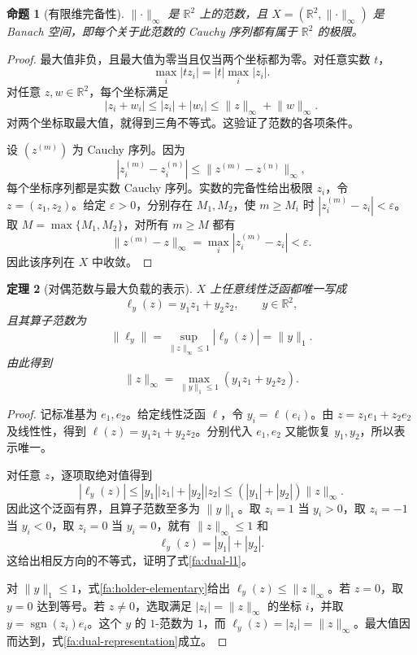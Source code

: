 \documentclass[UTF8,a4paper]{ctexbook}
\newtheorem{theorem}{定理}[chapter]
\newtheorem{proposition}[theorem]{命题}
\theoremstyle{definition}
\numberwithin{equation}{chapter}
\newcommand{\1}{\mathbf{1}}
\begin{document}
\begin{proposition}[有限维完备性]\label{fa:banach}
$\lVert\cdot\rVert_\infty$ 是 $\mathbb R^2$ 上的范数，且 $X=(\mathbb R^2,\lVert\cdot\rVert_\infty)$ 是 Banach 空间，即每个关于此范数的 Cauchy 序列都有属于 $\mathbb R^2$ 的极限。
\end{proposition}

\begin{proof}
最大值非负，且最大值为零当且仅当两个坐标都为零。对任意实数 $t$，
\[
\max_i|tz_i|=|t|\max_i|z_i|.
\]
对任意 $z,w\in\mathbb R^2$，每个坐标满足
\[
|z_i+w_i|\le |z_i|+|w_i|
\le\lVert z\rVert_\infty+\lVert w\rVert_\infty.
\]
对两个坐标取最大值，就得到三角不等式。这验证了范数的各项条件。

设 $(z^{(m)})$ 为 Cauchy 序列。因为
\[
|z_i^{(m)}-z_i^{(n)}|\le\lVert z^{(m)}-z^{(n)}\rVert_\infty,
\]
每个坐标序列都是实数 Cauchy 序列。实数的完备性给出极限 $z_i$，令 $z=(z_1,z_2)$。给定 $\varepsilon>0$，分别存在 $M_1,M_2$，使 $m\ge M_i$ 时 $|z_i^{(m)}-z_i|<\varepsilon$。取 $M=\max\{M_1,M_2\}$，对所有 $m\ge M$ 都有
\[
\lVert z^{(m)}-z\rVert_\infty
=\max_i|z_i^{(m)}-z_i|<\varepsilon.
\]
因此该序列在 $X$ 中收敛。
\end{proof}

\begin{theorem}[对偶范数与最大负载的表示]\label{fa:dual-norm}
$X$ 上任意线性泛函都唯一写成
\[
\ell_y(z)=y_1z_1+y_2z_2,
\qquad y\in\mathbb R^2,
\]
且其算子范数为
\begin{equation}\label{fa:dual-l1}
\lVert\ell_y\rVert
=\sup_{\lVert z\rVert_\infty\le1}|\ell_y(z)|
=\lVert y\rVert_1.
\end{equation}
由此得到
\begin{equation}\label{fa:dual-representation}
\lVert z\rVert_\infty
=\max_{\lVert y\rVert_1\le1}(y_1z_1+y_2z_2).
\end{equation}
\end{theorem}

\begin{proof}
记标准基为 $e_1,e_2$。给定线性泛函 $\ell$，令 $y_i=\ell(e_i)$。由 $z=z_1e_1+z_2e_2$ 及线性性，得到 $\ell(z)=y_1z_1+y_2z_2$。分别代入 $e_1,e_2$ 又能恢复 $y_1,y_2$，所以表示唯一。

对任意 $z$，逐项取绝对值得到
\begin{equation}\label{fa:holder-elementary}
|\ell_y(z)|
\le |y_1||z_1|+|y_2||z_2|
\le(|y_1|+|y_2|)\lVert z\rVert_\infty.
\end{equation}
因此这个泛函有界，且算子范数至多为 $\lVert y\rVert_1$。取 $z_i=1$ 当 $y_i>0$，取 $z_i=-1$ 当 $y_i<0$，取 $z_i=0$ 当 $y_i=0$，就有 $\lVert z\rVert_\infty\le1$ 和
\[
\ell_y(z)=|y_1|+|y_2|.
\]
这给出相反方向的不等式，证明了式\eqref{fa:dual-l1}。

对 $\lVert y\rVert_1\le1$，式\eqref{fa:holder-elementary}给出 $\ell_y(z)\le\lVert z\rVert_\infty$。若 $z=0$，取 $y=0$ 达到等号。若 $z\ne0$，选取满足 $|z_i|=\lVert z\rVert_\infty$ 的坐标 $i$，并取 $y=\operatorname{sgn}(z_i)e_i$。这个 $y$ 的 $1$-范数为 $1$，而 $\ell_y(z)=|z_i|=\lVert z\rVert_\infty$。最大值因而达到，式\eqref{fa:dual-representation}成立。
\end{proof}
\end{document}
